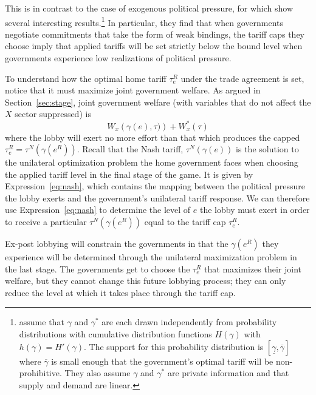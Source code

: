 \documentclass[12pt]{article}
\newcommand{\ov}{\overline}
\newcommand{\un}{\underline}
\newcommand{\ga}{\gamma}
\begin{document}
This is in contrast to the case of exogenous political pressure, for which \Textcite{bs2005} show several interesting results.\footnote{\Textcite{bs2005} assume that $\ga$ and $\ga^*$ are each drawn independently from probability distributions with cumulative distribution functions $H(\ga)$ with $h(\ga)=H'(\ga)$. The support for this probability distribution is $\left[\un{\ga}, \ov{\ga} \right]$ where $\ov{\ga}$ is small enough that the government's optimal tariff will be non-prohibitive. They also assume $\ga$ and $\ga^*$ are private information and that supply and demand are linear.} In particular, they find that when governments negotiate commitments that take the form of weak bindings, the tariff caps they choose imply that applied tariffs will be set strictly below the bound level when governments experience low realizations of political pressure.

To understand how the optimal home tariff $\tau_e^R$ under the trade agreement is set, notice that it must maximize joint government welfare. As argued in Section~\ref{sec:stage}, joint government welfare (with variables that do not affect the $X$ sector suppressed) is
  \begin{equation}
		W_x \left(\ga(e),\tau) \right) + W_x^*\left(\tau \right)
	  \label{exp:1}
	\end{equation}
where the lobby will exert no more effort than that which produces the capped $\tau_e^R=\tau^N(\ga(e^R))$. Recall that the Nash tariff, $\tau^N(\ga(e))$ is the solution to the unilateral optimization problem the home government faces when choosing the applied tariff level in the final stage of the game. It is given by Expression~\ref{eq:nash}, which contains the mapping between the political pressure the lobby exerts and the government's unilateral tariff response. We can therefore use Expression~\ref{eq:nash} to determine the level of $e$ the lobby must exert in order to receive a particular $\tau^N(\ga(e^R))$ equal to the tariff cap $\tau_e^R$.

Ex-post lobbying will constrain the governments in that the $\ga\left(e^R\right)$ they experience will be determined through the unilateral maximization problem in the last stage. The governments get to choose the $\tau_e^R$ that maximizes their joint welfare, but they cannot change this future lobbying process; they can only reduce the level at which it takes place through the tariff cap.
\end{document}
